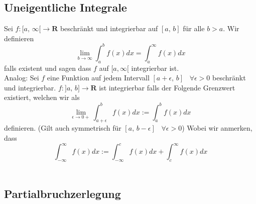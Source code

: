 \documentclass[8pt]{extarticle}
\begin{document}
\begin{multicols*}{3}
\subsection{Uneigentliche Integrale}

Sei $f:[a,\,\infty[ \rightarrow \mathbf{R}$ beschränkt und integrierbar auf $[a,\,b]$ für alle $b > a$. Wir definieren
$$
  \lim_{b \rightarrow \infty} \int_a^b f(x) dx = \int_a^\infty f(x) dx
$$
falls existent und sagen dass $f$ auf $[a, \infty[$ integrierbar ist.\\
Analog: Sei $f$ eine Funktion auf jedem Intervall $[a+\epsilon,\,b]\;\;\;\forall \epsilon > 0$
beschränkt und integrierbar. $f:]a,\,b] \rightarrow \mathbf{R}$ ist integrierbar falls der Folgende Grenzwert existiert, welchen wir als
$$
  \lim_{\epsilon \rightarrow 0+} \int_{a + \epsilon}^b f(x) dx := \int_a^b f(x) dx
$$
definieren. (Gilt auch symmetrisch für $[a,\,b-\epsilon]\;\;\;\forall \epsilon > 0$)
Wobei wir anmerken, dass $$\int_{-\infty}^\infty f(x) dx := \int_{-\infty}^c f(x) dx + \int_c^\infty f(x) dx$$
\\

\subsection{Partialbruchzerlegung}


\end{multicols*}
\end{document}

